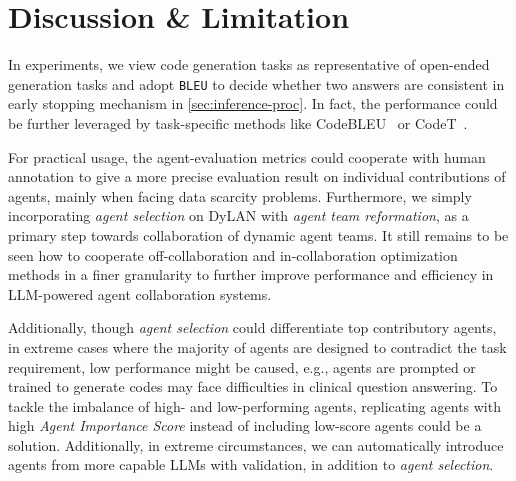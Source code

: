 \documentclass{article} %
\begin{document}






\appendix

\section{Discussion \& Limitation}

In experiments, we view code generation tasks as representative of open-ended generation tasks and adopt \texttt{BLEU} to decide whether two answers are consistent in early stopping mechanism in \cref{sec:inference-proc}. In fact, the performance could be further leveraged by task-specific methods like CodeBLEU~\citep{Ren2020CodeBLEUAM} or CodeT~\citep{chen2023codet}.

For practical usage, the agent-evaluation metrics could cooperate with human annotation to give a more precise evaluation result on individual contributions of agents, mainly when facing data scarcity problems. Furthermore, we simply incorporating \textit{agent selection} on DyLAN with \textit{agent team reformation}, as a primary step towards collaboration of dynamic agent teams. It still remains to be seen how to cooperate off-collaboration and in-collaboration optimization methods in a finer granularity to further improve performance and efficiency in LLM-powered agent collaboration systems.

Additionally, though \textit{agent selection} could differentiate top contributory agents, in extreme cases where the majority of agents are designed to contradict the task requirement, low performance might be caused, e.g., agents are prompted or trained to generate codes may face difficulties in clinical question answering. To tackle the imbalance of high- and low-performing agents, replicating agents with high  \textit{Agent Importance Score} instead of including low-score agents could be a solution. Additionally, in extreme circumstances, we can automatically introduce agents from more capable LLMs with validation, in addition to \textit{agent selection}.
\end{document}
